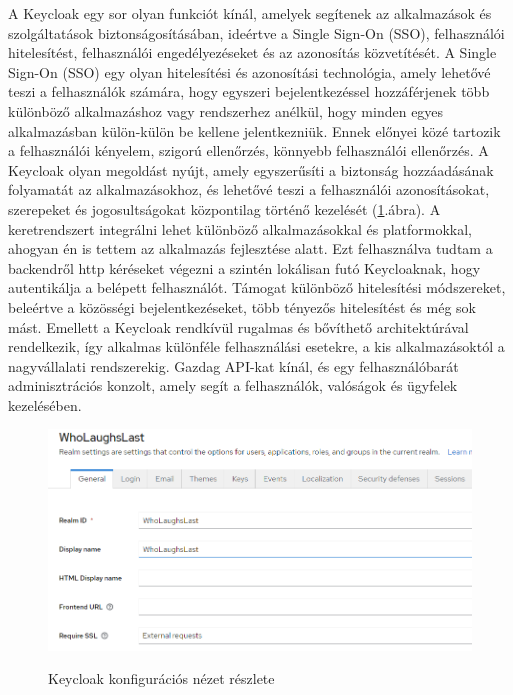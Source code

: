 \documentclass[a4paper,twoside]{article}
\begin{document}
A Keycloak egy sor olyan funkciót kínál, amelyek segítenek az alkalmazások és szolgáltatások biztonságosításában, ideértve a Single Sign-On (SSO), felhasználói hitelesítést, felhasználói engedélyezéseket és az azonosítás közvetítését. A Single Sign-On (SSO) egy olyan hitelesítési és azonosítási technológia, amely lehetővé teszi a felhasználók számára, hogy egyszeri bejelentkezéssel hozzáférjenek több különböző alkalmazáshoz vagy rendszerhez anélkül, hogy minden egyes alkalmazásban külön-külön be kellene jelentkezniük. Ennek előnyei közé tartozik a felhasználói kényelem, szigorú ellenőrzés, könnyebb felhasználói ellenőrzés. A Keycloak olyan megoldást nyújt, amely egyszerűsíti a biztonság hozzáadásának folyamatát az alkalmazásokhoz, és lehetővé teszi a felhasználói azonosításokat, szerepeket és jogosultságokat központilag történő kezelését (\ref{keycloak-login}.ábra). A keretrendszert integrálni lehet különböző alkalmazásokkal és platformokkal, ahogyan én is tettem az alkalmazás fejlesztése alatt. Ezt felhasználva tudtam a backendről http kéréseket végezni a szintén lokálisan futó Keycloaknak, hogy autentikálja a belépett felhasználót. Támogat különböző hitelesítési módszereket, beleértve a közösségi bejelentkezéseket, több tényezős hitelesítést és még sok mást. Emellett a Keycloak rendkívül rugalmas és bővíthető architektúrával rendelkezik, így alkalmas különféle felhasználási esetekre, a kis alkalmazásoktól a nagyvállalati rendszerekig. Gazdag API-kat kínál, és egy felhasználóbarát adminisztrációs konzolt, amely segít a felhasználók, valóságok és ügyfelek kezelésében.

\begin{figure}
	\caption{Keycloak konfigurációs nézet részlete}
	\includegraphics[scale=0.5]{keycloak-login}
	\label{keycloak-login}
\end{figure}
\end{document}
